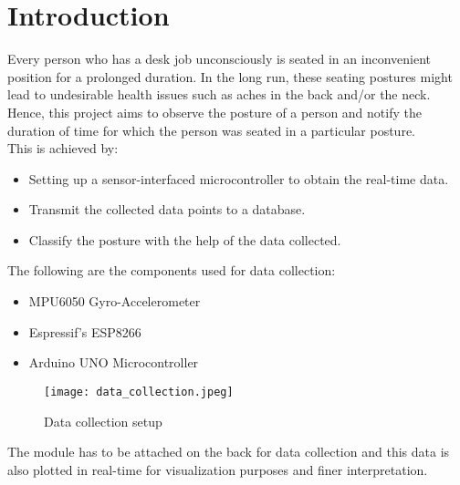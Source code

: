 \documentclass[./main.tex]{subfiles}
\begin{document}
\chapter{Introduction}
Every person who has a desk job unconsciously is seated in an inconvenient
position for a prolonged duration. In the long run, these seating postures
might lead to undesirable health issues such as aches in the back and/or the
neck. Hence, this project aims to observe the posture of a person and notify
the duration of time for which the person was seated in a particular posture.
\\
This is achieved by:
\begin{itemize}
    \item Setting up a sensor-interfaced microcontroller to obtain the real-time data.
    \item Transmit the collected data points to a database.
    \item Classify the posture with the help of the data collected.
\end{itemize}

The following are the components used for data collection:
\begin{itemize}
    \item MPU6050 Gyro-Accelerometer
    \item Espressif's ESP8266
    \item Arduino UNO Microcontroller
\end{itemize}

\begin{figure}[H]
    \centering
    \texttt{[image: data\_collection.jpeg]}
    \caption{Data collection setup}
    \label{fig:datacollect}
\end{figure}

The module has to be attached on the back for data collection and this data is
also plotted in real-time for visualization purposes and finer interpretation.
\end{document}
